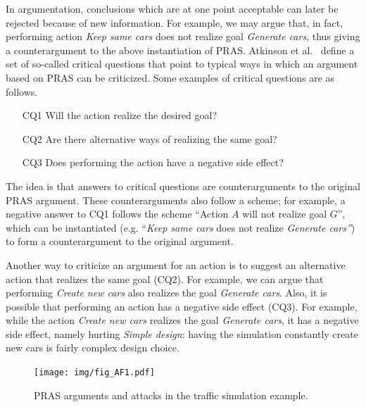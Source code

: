 In argumentation, conclusions which are at one point acceptable can later be rejected because of new information. For example, we may argue that, in fact, performing action \emph{Keep same cars} does not realize goal \emph{Generate cars}, thus giving a counterargument to the above instantiation of PRAS. Atkinson et al.~\cite{atkinson2007} define a set of so-called critical questions that point to typical ways in which an argument based on PRAS can be criticized. Some examples of critical questions are as follows.

\begin{enumerate}
\item[CQ1] Will the action realize the desired goal?
\item[CQ2] Are there alternative ways of realizing the same goal?
\item[CQ3] Does performing the action have a negative side effect?
\end{enumerate}

The idea is that answers to critical questions are counterarguments to the original PRAS argument. These counterarguments also follow a scheme; for example, a negative answer to CQ1 follows the scheme ``Action $A$ will not realize goal $G$'', which can be instantiated (e.g. ``\emph{Keep same cars} does not realize \emph{Generate cars''}) to form a counterargument to the original argument. 

Another way to criticize an argument for an action is to suggest an alternative action that realizes the same goal (CQ2). For example, we can argue that performing \emph{Create new cars} also realizes the goal \emph{Generate cars}. Also, it is possible that performing an action has a negative side effect (CQ3). For example, while the action \emph{Create new cars} realizes the goal \emph{Generate cars}, it has a negative side effect, namely hurting \emph{Simple design}: having the simulation constantly create new cars is fairly complex design choice. 

\begin{figure}[t]
\centering
\texttt{[image: img/fig\_AF1.pdf]}
\caption{PRAS arguments and attacks in the traffic simulation example.}
\label{fig:pras:example}
\end{figure}

